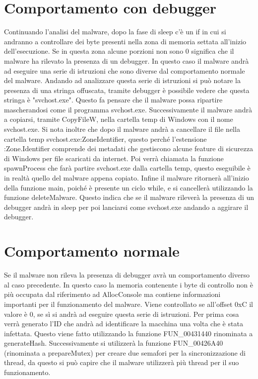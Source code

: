 \documentclass[a4paper,12pt]{article}
\begin{document}
\section{Comportamento con debugger}
Continuando l'analisi del malware, dopo la fase di sleep c'è un if in cui si andranno a controllare dei byte presenti nella zona di memoria settata all'inizio dell'esecuzione. Se in questa zona alcune porzioni non sono 0 significa che il malware ha rilevato la presenza di un debugger. In questo caso il malware andrà ad eseguire una serie di istruzioni che sono diverse dal comportamento normale del malware. Andando ad analizzare questa serie di istruzioni si può notare la presenza di una stringa offuscata, tramite debugger è possibile vedere che questa stringa è "svchost.exe". Questo fa pensare che il malware possa ripartire mascherandosi come il programma svchost.exe. 
Successivamente il malware andrà a copiarsi, tramite CopyFileW, nella cartella temp di Windows con il nome svchost.exe.
Si nota inoltre che dopo il malware andrà a cancellare il file nella cartella temp svchost.exe:ZoneIdentifier, questo perché l'estensione :Zone.Identifier comprende dei metadati che gestiscono alcune feature di sicurezza di Windows per file scaricati da internet. 
Poi verrà chiamata la funzione spawnProcess che farà partire svchost.exe dalla cartella temp, questo eseguibile è in realtà quello del malware appena copiato.  Infine il malware ritornerà all'inizio della funzione main, poiché è presente un ciclo while, e si cancellerà utilizzando la funzione deleteMalware. Questo indica che se il malware rileverà la presenza di un debugger andrà in sleep per poi lanciarsi come svchost.exe andando a aggirare il debugger.

\section{Comportamento normale}
Se il malware non rileva la presenza di debugger avrà un comportamento diverso al caso precedente. In questo caso la memoria contenente i byte di controllo non è più occupata dal riferimento ad AllocConsole ma contiene informazioni importanti per il funzionamento del malware. Viene controllato se all'offset 0xC il valore è 0, se sì si andrà ad eseguire questa serie di istruzioni. 
Per prima cosa verrà generato l'ID che andrà ad identificare la macchina una volta che è stata infettata. Questo viene fatto utilizzando la funzione FUN\_00431440 rinominata a generateHash. Successivamente si utilizzerà la funzione FUN\_00426A40 (rinominata a prepareMutex) per creare due semafori per la sincronizzazione di thread, da questo si può capire che il malware utilizzerà più thread per il suo funzionamento. 
\end{document}
